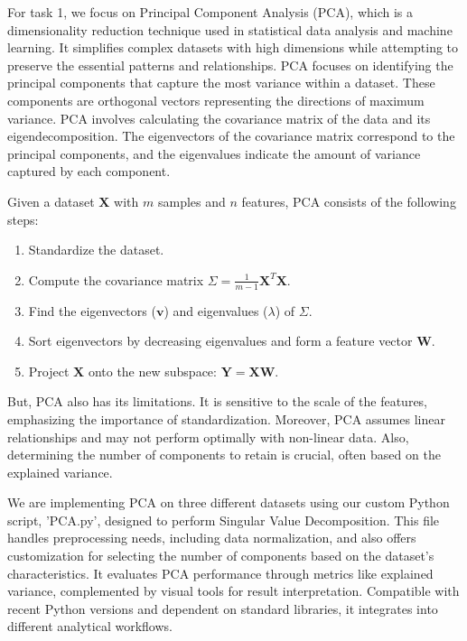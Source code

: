 For task 1, we focus on Principal Component Analysis (PCA), which is a dimensionality reduction technique used in statistical data analysis and machine learning. It simplifies complex datasets with high dimensions while attempting to preserve the essential patterns and relationships. PCA focuses on identifying the principal components that capture the most variance within a dataset. These components are orthogonal vectors representing the directions of maximum variance. PCA involves calculating the covariance matrix of the data and its eigendecomposition. The eigenvectors of the covariance matrix correspond to the principal components, and the eigenvalues indicate the amount of variance captured by each component. 

Given a dataset $\mathbf{X}$ with $m$ samples and $n$ features, PCA consists of the following steps:

\begin{enumerate}
  \item Standardize the dataset.
  \item Compute the covariance matrix $\Sigma = \frac{1}{m-1} \mathbf{X}^T \mathbf{X}$.
  \item Find the eigenvectors ($\mathbf{v}$) and eigenvalues ($\lambda$) of $\Sigma$.
  \item Sort eigenvectors by decreasing eigenvalues and form a feature vector $\mathbf{W}$.
  \item Project $\mathbf{X}$ onto the new subspace: $\mathbf{Y} = \mathbf{X} \mathbf{W}$.
\end{enumerate}
But, PCA also has its limitations. It is sensitive to the scale of the features, emphasizing the importance of standardization. Moreover, PCA assumes linear relationships and may not perform optimally with non-linear data. Also, determining the number of components to retain is crucial, often based on the explained variance.

We are implementing PCA on three different datasets using our custom Python script, 'PCA.py', designed to perform Singular Value Decomposition. This file handles preprocessing needs, including data normalization, and also offers customization for selecting the number of components based on the dataset's characteristics. It evaluates PCA performance through metrics like explained variance, complemented by visual tools for result interpretation. Compatible with recent Python versions and dependent on standard libraries, it integrates into different analytical workflows.

